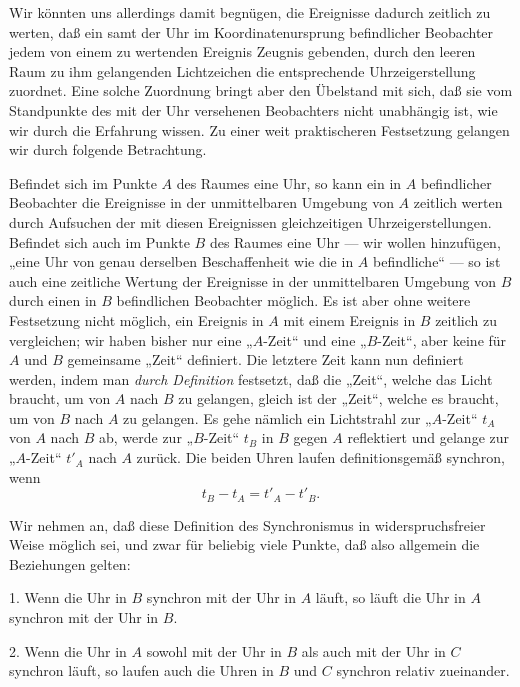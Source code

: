 \documentclass[17pt]{webarticle}       %
\begin{document}
Wir könnten uns allerdings damit begnügen, die Ereignisse dadurch zeitlich zu werten, daß ein samt der Uhr im Koordinatenursprung befindlicher Beobachter jedem von einem zu wertenden Ereignis Zeugnis gebenden, durch den leeren Raum zu ihm gelangenden Lichtzeichen die entsprechende Uhrzeigerstellung zuordnet. Eine solche Zuordnung bringt aber den Übelstand mit sich, daß sie vom Standpunkte des mit der Uhr versehenen Beobachters nicht unabhängig ist, wie wir durch die Erfahrung wissen. Zu einer weit praktischeren Festsetzung gelangen wir durch folgende Betrachtung.

Befindet sich im Punkte \( A \) des Raumes eine Uhr, so kann ein in \( A \) befindlicher Beobachter die Ereignisse in der unmittelbaren Umgebung von \( A \) zeitlich werten durch Aufsuchen der mit diesen Ereignissen gleichzeitigen Uhrzeigerstellungen. Befindet sich auch im Punkte \( B \) des Raumes eine Uhr — wir wollen hinzufügen, „eine Uhr von genau derselben Beschaffenheit wie die in \( A \) befindliche“ — so ist auch eine zeitliche Wertung der Ereignisse in der unmittelbaren Umgebung von \( B \) durch einen in \( B \) befindlichen Beobachter möglich. Es ist aber ohne weitere Festsetzung nicht möglich, ein Ereignis in \( A \) mit einem Ereignis in \( B \) zeitlich zu vergleichen; wir haben bisher nur eine „\( A \)-Zeit“ und eine „\( B \)-Zeit“, aber keine für \( A \) und \( B \) gemeinsame „Zeit“ definiert. Die letztere Zeit kann nun definiert werden, indem man \emph{durch Definition} festsetzt, daß die „Zeit“, welche das Licht braucht, um von \( A \) nach \( B \) zu gelangen, gleich ist der „Zeit“, welche es braucht, um von \( B \) nach \( A \) zu gelangen. Es gehe nämlich ein Lichtstrahl zur „\( A \)-Zeit“ \( t_A \) von \( A \) nach \( B \) ab, werde zur „\( B \)-Zeit“ \( t_B \) in \( B \) gegen \( A \) reflektiert und gelange zur „\( A \)-Zeit“ \( t'_A \) nach \( A \) zurück. Die beiden Uhren laufen definitionsgemäß synchron, wenn
\[
t_B - t_A = t'_A - t'_B .
\]

Wir nehmen an, daß diese Definition des Synchronismus in widerspruchsfreier Weise möglich sei, und zwar für beliebig viele Punkte, daß also allgemein die Beziehungen gelten:

1. Wenn die Uhr in \( B \) synchron mit der Uhr in \( A \) läuft, so läuft die Uhr in \( A \) synchron mit der Uhr in \( B \).

2. Wenn die Uhr in \( A \) sowohl mit der Uhr in \( B \) als auch mit der Uhr in \( C \) synchron läuft, so laufen auch die Uhren in \( B \) und \( C \) synchron relativ zueinander.
\end{document}
